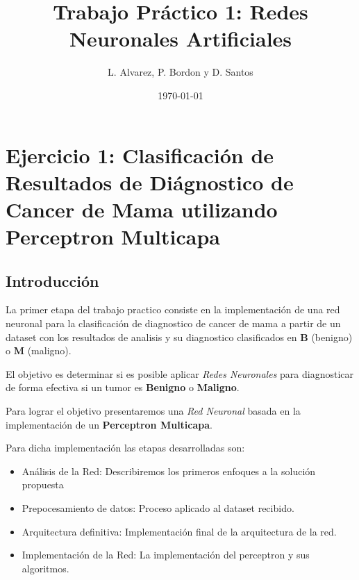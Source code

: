 \documentclass[onecolumn,10pt]{article}
\begin{document}
 

\title{Trabajo Práctico 1: Redes Neuronales Artificiales}

\author{L. Alvarez, P. Bordon y D. Santos}

\date{\today}


\maketitle


\newpage

\tableofcontents

\newpage

\section{Ejercicio 1: Clasificación de Resultados de Diágnostico de Cancer de Mama utilizando Perceptron Multicapa}

\subsection{Introducción}
La primer etapa del trabajo practico consiste en la implementación
de una red neuronal para la clasificación de diagnostico de cancer
de mama a partir de un dataset con los resultados de analisis y
su diagnostico clasificados en \textbf{B} (benigno) o \textbf{M} (maligno).

El objetivo es determinar si es posible aplicar \emph{Redes Neuronales} para
diagnosticar de forma efectiva si un tumor es \textbf{Benigno} o \textbf{Maligno}.

Para lograr el objetivo presentaremos una \emph{Red Neuronal} basada en la
implementación de un \textbf{Perceptron Multicapa}.

Para dicha implementación las etapas desarrolladas son:

\begin{itemize}
\item Análisis de la Red: Describiremos los primeros enfoques a la
  solución propuesta
\item Prepocesamiento de datos: Proceso aplicado al dataset recibido.
\item Arquitectura definitiva: Implementación final de la arquitectura
  de la red.
\item Implementación de la Red: La implementación del perceptron y sus
   algoritmos.
\end{itemize}
\end{document}
